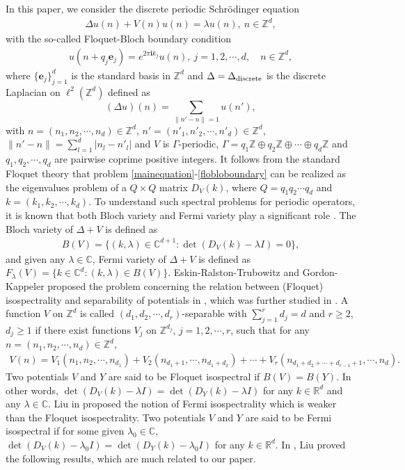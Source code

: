 \documentclass[12pt,letterpaper]{amsart}
\def\R{{\mathbb R}}
\def\C{{\mathbb C}}
\def\Z{{\mathbb Z}}
\begin{document}
In this paper, we consider the discrete periodic Schr\"odinger equation
\begin{align}
	\Delta u(n)+V(n)u(n)=\lambda u(n),\ n\in\mathbb{Z}^d,\label{mainequation}
\end{align}
with the so-called Floquet-Bloch boundary condition
\begin{align}
	u(n+q_j\mathbf{e}_j)=e^{2\pi \mathbf{i}k_j}u(n),\ j=1,2,\cdots,d,\quad n\in\mathbb{Z}^d,\label{flobloboundary}
\end{align}
{where $\{\mathbf{e}_j\}_{j=1}^d$ is the standard basis in $\mathbb{Z}^d$} and $\Delta=\Delta_{\rm discrete}$ is the discrete Laplacian
on $\ell^2(\Z^d)$ defined as
\[(\Delta u)(n)=\sum_{\|n'-n\|=1}u(n'),\]
with $n=(n_1,n_2,\cdots,n_d)\in\Z^d$, $n'=(n'_1,n'_2,\cdots,n'_d)\in\Z^d$,
$\|n'-n\|=\sum_{l=1}^{d}|n_l-n'_l|$ and
$V$ is $\Gamma$-periodic, $\Gamma=q_1\mathbb{Z}\oplus q_2\mathbb{Z}\oplus\cdots\oplus q_d\mathbb{Z}$ and $q_1,q_2,\cdots,q_d$ are pairwise coprime positive integers.
It follows from the standard Floquet
theory that problem \eqref{mainequation}-\eqref{flobloboundary} can be realized as the eigenvalues problem of a $Q\times Q$ matrix $D_V(k)$, where $Q=q_1q_2\cdots q_d$ and $k=(k_1,k_2,\cdots,k_d)$. To understand such spectral problems for periodic operators, it is known that both Bloch variety and Fermi variety play a significant role \cite{aim,bat-1, bat-2, flm-1,gkt, kt,kv-2, liu22, liujmp, lmt,sh}. The Bloch variety of $\Delta+V$ is defined as
\begin{align}
	B(V)=\{(k,\lambda)\in\C^{d+1}:\det(D_V(k)-\lambda I)=0\},\nonumber
\end{align}
and given any $\lambda\in\C$, Fermi variety of $\Delta+V$ is defined as $F_{\lambda}(V)=\{k\in\C^d:(k,\lambda)\in B(V)\}$. Eskin-Ralston-Trubowitz and Gordon-Kappeler  proposed the problem concerning the relation between (Floquet) isospectrality and separability of potentials in  \cite{ert-1, ert-2, gk-1}, which was further studied in \cite{flmp,k-2,k-3,liucmp,liujde,liucpam}. A function $V$ on $\mathbb{Z}^d$ is called $(d_1,d_2,\cdots,d_r)$-separable with $\sum_{j=1}^rd_j=d$ and $r\geq 2$, $d_j\geq 1$ if there exist functions $V_j$ on $\mathbb{Z}^{d_j}$, $j=1,2,\cdots,r$, such that for any $n=(n_1,n_2,\cdots,n_d)\in \mathbb{Z}^d$,
\begin{align}
	V(n)=V_1(n_1,n_2,\cdots,n_{d_1})+V_2(n_{d_1+1},\cdots,n_{d_1+d_2})+\cdots+V_r(n_{d_1+d_2+\cdots+d_{r-1}+1},\cdots,n_d).\nonumber
\end{align}
Two potentials $V$ and $Y$ are said to be Floquet isospectral if $B(V)=B(Y)$. In other words, $\det(D_V(k)-\lambda I)=\det(D_Y(k)-\lambda I)$ for any $k\in\R^d$ and any $\lambda\in\C$.  Liu in \cite{liucpam} proposed the notion of Fermi isospectrality which is weaker than the Floquet isospectrality. Two potentials $V$ and $Y$ are said to be Fermi isospectral if for some given $\lambda_0\in\C$, $\det(D_V(k)-\lambda_0I)= \det(D_Y(k)-\lambda_0I)$ for any $k\in \R^d$.  In \cite{liucpam}, Liu proved the following results, which are much related to our paper.
\end{document}
